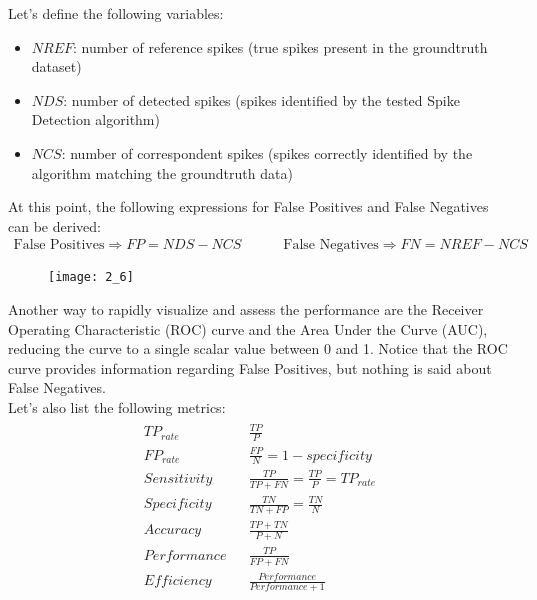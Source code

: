 Let's define the following variables:
\begin{itemize}
    \item \(NREF\): number of reference spikes (true spikes present in
          the groundtruth dataset)
    \item \(NDS\): number of detected spikes (spikes identified by the
          tested Spike Detection algorithm)
    \item \(NCS\): number of correspondent spikes (spikes correctly
          identified by the algorithm matching the groundtruth data)
\end{itemize}
At this point, the following expressions for False Positives and False Negatives
can be derived:
\begin{align*}
    \text{False Positives}\Rightarrow FP=NDS-NCS
    \quad\quad\quad
    \text{False Negatives}\Rightarrow FN=NREF-NCS
\end{align*}
\begin{figure}[H]
    \texttt{[image: 2\_6]}
    \centering
\end{figure}
Another way to rapidly visualize and assess the performance are the Receiver
Operating Characteristic (ROC) curve and the Area Under the Curve (AUC), reducing
the curve to a single scalar value between 0 and 1. Notice that the ROC curve
provides information regarding False Positives, but nothing is said about
False Negatives.\\
Let's also list the following metrics:
\begin{align*}
    \begin{matrix}
        TP_{rate}   &  & \frac{TP}{P}                            \\
        FP_{rate}   &  & \frac{FP}{N}=1-specificity              \\
        Sensitivity &  & \frac{TP}{TP+FN}=\frac{TP}{P}=TP_{rate} \\
        Specificity &  & \frac{TN}{TN+FP}=\frac{TN}{N}           \\
        Accuracy    &  & \frac{TP+TN}{P+N}                       \\
        Performance &  & \frac{TP}{FP+FN}                        \\
        Efficiency  &  & \frac{Performance}{Performance+1}
    \end{matrix}
\end{align*}